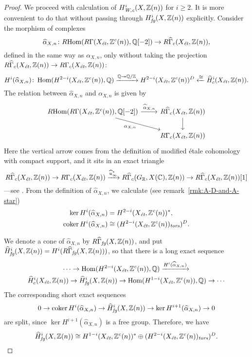 \documentclass{article}
\numberwithin{equation}{section}
\begin{document}
\begin{proof}
  \vspace{1em}

  We proceed with calculation of $H^i_\Wc (X, \ZZ(n))$ for $i \ge 2$. It is
  more convenient to do that without passing through $H^i_\fg (X, \ZZ(n))$
  explicitly. Consider the morphism of complexes
  \[ \widehat{\alpha}_{X,n}\colon
    \RHom (R\Gamma (X_\et, \ZZ^c(n)), \QQ[-2]) \to
    R\widehat{\Gamma}_c (X_\et, \ZZ(n)), \]
  defined in the same way as $\alpha_{X,n}$, only without taking the
  projection
  $R\widehat{\Gamma}_c (X_\et, \ZZ(n)) \to R\Gamma_c (X_\et, \ZZ(n))$:
  \[ H^i (\widehat{\alpha}_{X,n})\colon \Hom (H^{2-i} (X_\et, \ZZ^c(n)), \QQ)
    \xrightarrow{\QQ \twoheadrightarrow \QQ/\ZZ}
    H^{2-i} (X_\et, \ZZ^c(n))^D
    \xleftarrow{\cong} \widehat{H}^i_c (X_\et, \ZZ(n)). \]
  The relation between $\widehat{\alpha}_{X,n}$ and $\alpha_{X,n}$
  is given by
  \[ \begin{tikzcd}
      \RHom (R\Gamma (X_\et, \ZZ^c(n)), \QQ[-2]) \ar{r}{\widehat{\alpha}_{X,n}}\ar{dr}[swap]{\alpha_{X,n}} & R\widehat{\Gamma}_c (X_\et, \ZZ(n)) \ar{d} \\
      & R\Gamma_c (X_\et, \ZZ(n))
    \end{tikzcd} \]
  Here the vertical arrow comes from the definition of modified étale
  cohomology with compact support, and it sits in an exact triangle
  \[ R\widehat{\Gamma}_c (X_\et, \ZZ(n)) \to
    R\Gamma_c (X_\et, \ZZ(n)) \xrightarrow{\widehat{u}^*_\infty}
    R\widehat{\Gamma}_c (G_\RR, X(\CC), \ZZ(n)) \to
    R\widehat{\Gamma}_c (X_\et, \ZZ(n)) [1] \]
  ---see \cite[Lemma~6.14]{Flach-Morin-2018}.
  From the definition of $\widehat{\alpha}_{X,n}$, we calculate
  (see remark~\ref{rmk:A-D-and-A-star})
  \begin{align*}
    \ker H^i (\widehat{\alpha}_{X,n}) & = H^{2-i} (X_\et, \ZZ^c(n))^*, \\
    \coker H^i (\widehat{\alpha}_{X,n}) & \cong (H^{2-i} (X_\et, \ZZ^c (n))_\tors)^D.
  \end{align*}

  We denote a cone of $\widehat{\alpha}_{X,n}$ by
  $R\widehat{\Gamma}_\fg (X, \ZZ(n))$, and put
  $\widehat{H}^i_\fg (X, \ZZ(n)) = H^i (R\widehat{\Gamma}_\fg (X, \ZZ(n)))$,
  so that there is a long exact sequence
  \begin{multline*}
    \cdots \to \Hom (H^{2-i} (X_\et, \ZZ^c (n)), \QQ) \xrightarrow{H^i (\widehat{\alpha}_{X,n})} \\
    \widehat{H}^i_c (X_\et, \ZZ(n)) \to
    \widehat{H}^i_\fg (X, \ZZ(n)) \to
    \Hom (H^{1-i} (X_\et, \ZZ^c (n)), \QQ) \to \cdots
  \end{multline*}
  The corresponding short exact sequences
  \[ 0 \to \coker H^i (\widehat{\alpha}_{X,n}) \to
    \widehat{H}^i_\fg (X, \ZZ(n)) \to
    \ker H^{i+1} (\widehat{\alpha}_{X,n}) \to 0 \]
  are split, since $\ker H^{i+1} (\widehat{\alpha}_{X,n})$ is a free
  group. Therefore, we have
  \[ \widehat{H}^i_\fg (X, \ZZ(n)) \cong
    H^{1-i} (X_\et, \ZZ^c(n))^*
    \oplus
    (H^{2-i} (X_\et, \ZZ^c (n))_\tors)^D. \]


\end{proof}
\end{document}
